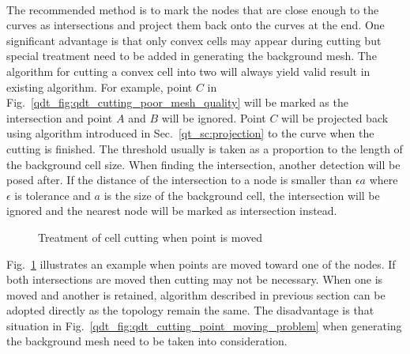 \paragraph{}
The recommended method is to mark the nodes that are close enough to the curves as intersections and project them back onto the curves at the end.
One significant advantage is that only convex cells may appear during cutting but special treatment need to be added in generating the background mesh.
The algorithm for cutting a convex cell into two will always yield valid result in existing algorithm.
For example, point $C$ in Fig.~\ref{qdt_fig:qdt_cutting_poor_mesh_quality} will be marked as the intersection and point $A$ and $B$ will be ignored.
Point $C$ will be projected back using algorithm introduced in Sec.~\ref{qt_sc:projection} to the curve when the cutting is finished.
The threshold usually is taken as a proportion to the length of the background cell size.
When finding the intersection, another detection will be posed after.
If the distance of the intersection to a node is smaller than $\epsilon a$ where $\epsilon$ is tolerance and $a$ is the size of the background cell, the intersection will be ignored and the nearest node will be marked as intersection instead.
\begin{figure}
    \centering
    \caption[Treatment of cell cutting when point is moved]{Treatment of cell cutting when point is moved}
    \label{qdt_fig:qdt_cutting_point_moving_1}
\end{figure}
Fig.~\ref{qdt_fig:qdt_cutting_point_moving_1} illustrates an example when points are moved toward one of the nodes.
If both intersections are moved then cutting may not be necessary.
When one is moved and another is retained, algorithm described in previous section can be adopted directly as the topology remain the same.
The disadvantage is that situation in Fig.~\ref{qdt_fig:qdt_cutting_point_moving_problem} when generating the background mesh need to be taken into consideration.
